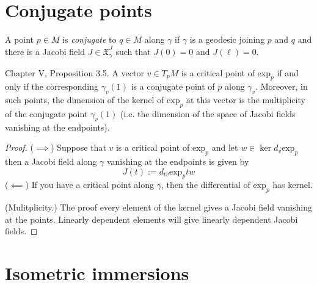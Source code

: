 \section{Conjugate points}
\label{section-conjugate-points}

\begin{definition}
\label{definition-conjugate-points}
A point $p \in M$ is {\it conjugate} to $q \in M$ along $\gamma$ if $\gamma$ is
a geodesic joining $p$ and $q$ and there is a Jacobi field 
$J\in\mathfrak{X}_\gamma^J$ such that $J(0)=0$ and  $J(\ell)=0$.
\end{definition}

\begin{proposition}
\label{proposition-critical-points-exp}
\cite{doc} Chapter V, Proposition 3.5. A vector $v \in T_pM$ is a critical
point of $\text{exp}_p$ if and only if the corresponding 
$\gamma_v(1)$ is a conjugate point of $p$ along $\gamma_v$.
Moreover, in such points, the dimension of the kernel of 
$\text{exp}_p$ at this vector is the multiplicity
of the conjugate point $\gamma_v(1)$ 
(i.e. the dimension of the space of Jacobi fields vanishing 
at the endpoints).
\end{proposition}

\begin{proof}
($\implies$) Suppose that $v$ is a critical point of $\text{exp}_p$ and 
let $w \in \ker d_v \text{exp}_p$ then a Jacobi field along $\gamma$ 
vanishing at the endpoints is given by
$$
J(t):=d_{tv}\text{exp}_ptw
$$
($\impliedby$) If you have a critical point along $\gamma$, then the 
differential of $\text{exp}_p$ has kernel.

(Mulitplicity.) The proof every element of the kernel gives a Jacobi
 field vanishing at the points. Linearly dependent elements will give 
 linearly dependent Jacobi fields.
\end{proof}

\section{Isometric immersions}
\label{section-isometric-immersions}

